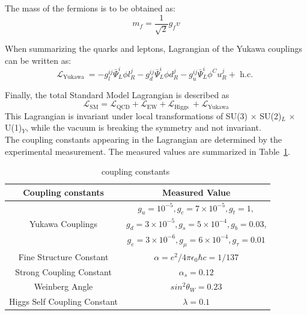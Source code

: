 The mass of the fermions is to be obtained as:
\begin{equation}
m_{f}=\frac{1}{\sqrt{2}} g_{f} v
\end{equation}

When summarizing the quarks and leptons, Lagrangian of the Yukawa couplings can be written as:
\begin{equation}
\mathcal{L}_{\text {Yukawa }}=-g_{l}^{i j} \bar{\Psi}_{L}^{i} \phi l_{R}^{j}-g_{d}^{i j} \bar{\Psi}_{L}^{i} \phi d_{R}^{j}-g_{u}^{i j} \bar{\Psi}_{L}^{i} \phi^{C} u_{R}^{j}+\text { h.c. }
\end{equation}

Finally, the total Standard Model Lagrangian is described as 
\begin{equation}
\mathcal{L}_{\mathrm{SM}}=\mathcal{L}_{\mathrm{QCD}}+\mathcal{L}_{\mathrm{EW}}+\mathcal{L}_{\text {Higgs }}+\mathcal{L}_{\text {Yukawa}}
\end{equation}
This Lagrangian is invariant under local transformations of SU(3) $\times$ SU(2)$_L$ $\times$ U(1)$_Y$, while the vacuum is breaking the symmetry and not invariant. \\

The coupling constants appearing in the Lagrangian are determined by the experimental measurement. 
The measured values are summarized in Table~\ref{tab:constants}.  \\

\begin{center}
\begin{table}
\centering
\begin{tabular}{|c|c|}
\hline
Coupling constants & Measured Value \\
\hline 
                             & $g_{u}=10^{-5}, g_{c}=7 \times 10^{-5}, g_{t}=1,$ \\
            Yukawa Couplings & $g_{d}=3 \times 10^{-5}, g_{s}=5 \times 10^{-4}, g_{b}=0.03$, \\
                             & $g_{e}=3 \times 10^{-6}, g_{\mu}=6 \times 10^{-4}, g_{\tau}=0.01$ \\
     Fine Structure Constant & $\alpha= e^2 / 4 \pi \epsilon_0 \hbar c = 1 / 137$ \\
    Strong Coupling Constant & $\alpha_{s}=0.12$ \\
              Weinberg Angle & $sin^{2} \theta_{W}=0.23$ \\
Higgs Self Coupling Constant & $\lambda=0.1$ \\
\hline
\end{tabular}
\caption{coupling constants~\cite{PhysRevD.98.030001}}
\label{tab:constants}
\end{table}
\end{center}

